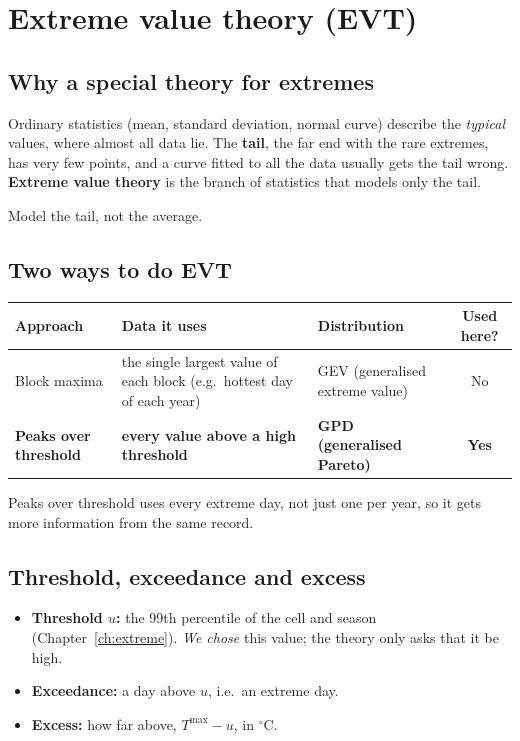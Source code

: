 \chapter{Extreme value theory (EVT)}
\label{ch:evt}

\section{Why a special theory for extremes}
Ordinary statistics (mean, standard deviation, normal curve) describe the \emph{typical} values, where almost all data
lie. The \textbf{tail}, the far end with the rare extremes, has very few points, and a curve fitted to all the data
usually gets the tail wrong. \textbf{Extreme value theory} is the branch of statistics that models only the tail.

\begin{keyidea}
Model the tail, not the average.
\end{keyidea}

\section{Two ways to do EVT}
\begin{center}
\footnotesize
\begin{tabular}{p{3.2cm}p{5.2cm}p{2.6cm}c}
\toprule
\textbf{Approach} & \textbf{Data it uses} & \textbf{Distribution} & \textbf{Used here?}\\
\midrule
Block maxima & the single largest value of each block (e.g.\ hottest day of each year) & GEV (generalised extreme
  value) & No\\
\textbf{Peaks over threshold} & \textbf{every value above a high threshold} & \textbf{GPD (generalised Pareto)} &
  \textbf{Yes}\\
\bottomrule
\end{tabular}
\end{center}
Peaks over threshold uses every extreme day, not just one per year, so it gets more information from the same record.

\section{Threshold, exceedance and excess}
\begin{itemize}
  \item \textbf{Threshold $u$:} the 99th percentile of the cell and season (Chapter~\ref{ch:extreme}). \emph{We chose}
        this value; the theory only asks that it be high.
  \item \textbf{Exceedance:} a day above $u$, i.e.\ an extreme day.
  \item \textbf{Excess:} how far above, $T^{\max}-u$, in $^\circ$C.
\end{itemize}

